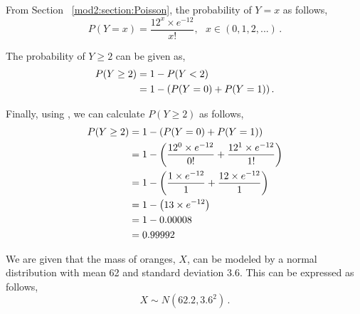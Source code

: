 \begin{subquestions}
\begin{subsubquestions}
From Section ~\ref{mod2:section:Poisson}, the probability of $Y=x$ as follows,
\begin{equation}
	P(Y=x) = \frac{12^{x} \times e^{-12}}{x!}, ~~~ x \in (0, 1, 2, ...)\,. \label{2014:q4:PoisEqn2}
\end{equation}

The probability of $Y \geq 2$ can be given as,
\begin{align}
	P(Y \geq 2) & = 1 - P(Y<2) \nonumber \\
	            & = 1 - (P(Y=0) + P(Y=1)) \,.
\end{align}

Finally, using , we can calculate  $P(Y \geq 2)$ as follows,
\begin{align}
	P(Y \geq 2) & = 1 - (P(Y=0) + P(Y=1)) \nonumber \\
	            & = 1 - \left(\frac{12^{0} \times e^{-12}}{0!} + \frac{12^{1} \times e^{-12}}{1!} \right) \nonumber \\
	            & = 1 - \left(\frac{1 \times e^{-12}}{1} + \frac{12 \times e^{-12}}{1} \right) \nonumber \\
	            & = 1 - \left(13 \times e^{-12} \right) \nonumber \\
	            & = 1 - 0.00008 \nonumber \\
	            & = 0.99992
\end{align}

\end{subsubquestions}

	
\subquestion

We are given that the mass of oranges, $X$, can be modeled by a normal distribution with mean 62 and standard deviation 3.6. This can be expressed as follows,
\begin{equation}
	X \sim N(62.2, 3.6^2) \,.
\end{equation}

\begin{subsubquestions}
	
\subsubquestion


\end{subsubquestions}
\end{subquestions}
